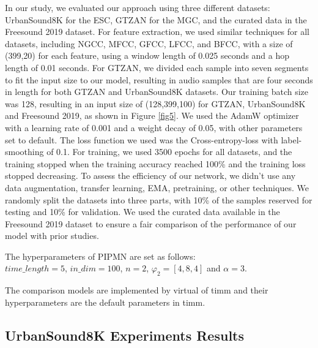 \documentclass[runningheads]{llncs}
\begin{document}
In our study, we evaluated our approach using three different datasets: UrbanSound8K for the ESC, GTZAN for the MGC, and the curated data in the Freesound 2019 dataset. For feature extraction, we used similar techniques for all datasets, including NGCC, MFCC, GFCC, LFCC, and BFCC, with a size of (399,20) for each feature, using a window length of 0.025 seconds and a hop length of 0.01 seconds.  For GTZAN, we divided each sample into seven segments to fit the input size to our model, resulting in audio samples that are four seconds in length for both GTZAN and UrbanSound8K datasets. Our training batch size was 128, resulting in an input size of (128,399,100) for GTZAN, UrbanSound8K and Freesound 2019, as shown in Figure \ref{fig5}. We used the AdamW optimizer with a learning rate of 0.001 and a weight decay of 0.05, with other parameters set to default. The loss function we used was the Cross-entropy-loss with label-smoothing of 0.1. For training, we used 3500 epochs for all datasets, and the training stopped when the training accuracy reached 100\% and the training loss stopped decreasing. To assess the efficiency of our network, we didn't use any data augmentation, transfer learning, EMA, pretraining, or other techniques. We randomly split the datasets into three parts, with 10\% of the samples reserved for testing and 10\% for validation. We used the curated data available in the Freesound 2019 dataset to ensure a fair comparison of the performance of our model with prior studies.

The hyperparameters of PIPMN are set as follows: \\$time\_length=5$, $in\_dim=100$, $n=2$, $\varphi_2=[4,8,4]$ and $\alpha=3$.

The comparison models are implemented by virtual of timm\cite{timm} and their hyperparameters are the default parameters in timm.

\subsection{UrbanSound8K Experiments Results}
\end{document}
